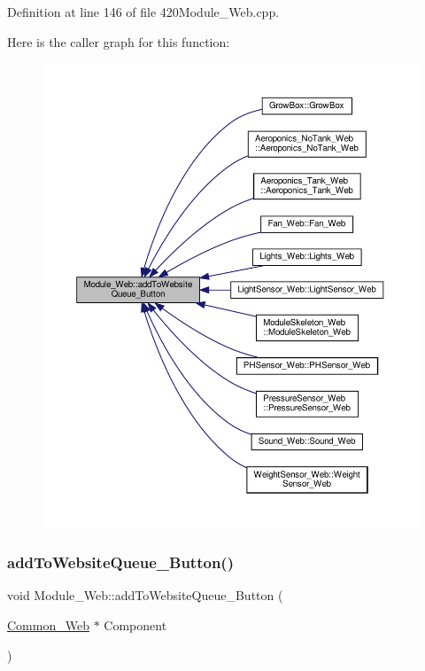 Definition at line 146 of file 420\+Module\+\_\+\+Web.\+cpp.

Here is the caller graph for this function\+:
\nopagebreak
\begin{figure}[H]
\begin{center}
\leavevmode
\includegraphics[width=350pt]{class_module___web_adadb1643a6b460c0d53a7341bb356ee1_icgraph}
\end{center}
\end{figure}
\mbox{\label{class_module___web_adadb1643a6b460c0d53a7341bb356ee1}} 
\subsubsection{\texorpdfstring{add\+To\+Website\+Queue\+\_\+\+Button()}{addToWebsiteQueue\_Button()}\hspace{0.1cm}{\footnotesize\ttfamily [2/2]}}
{\footnotesize\ttfamily void Module\+\_\+\+Web\+::add\+To\+Website\+Queue\+\_\+\+Button (\begin{DoxyParamCaption}\item[{\hyperlink{class_common___web}{Common\+\_\+\+Web} $\ast$}]{Component }\end{DoxyParamCaption})}

